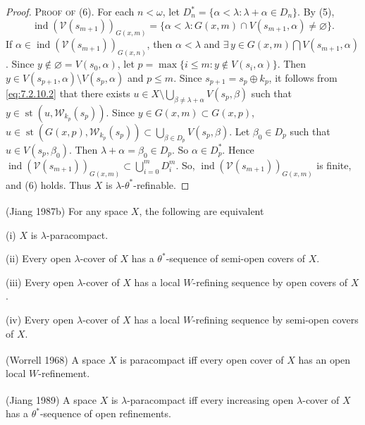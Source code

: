 \documentclass[jisng7iii.tex]{subfiles}
\begin{document}
\begin{proof}
\noindent\textsc{Proof of (6)}. For each $n < \omega$, let $D^*_{n} = \{\alpha < \lambda: \lambda + \alpha \in D_n\}$. 
By (5),
$$\operatorname{ind}(\mathscr{V}(s_{m+1}))_{G(x,m)} = 
\{\alpha < \lambda: G(x, m) \cap V(s_{m+1}, \alpha) \ne \varnothing\}.$$
If  $\alpha\in \operatorname{ind}(\mathscr{V}(s_{m+1}))_{G(x,n)}$, 
then $\alpha < \lambda$ and $\exists\, y\in G(x, m)\bigcap V(s_{m+1}, \alpha)$.
Since $y\notin \varnothing = V(s_0, \alpha)$, let $p = \max\{i \le m: y\notin V(s_i, \alpha)\}$.
Then $y\in V(s_{p+1}, \alpha)\setminus V(s_p, \alpha)$ and $p \le m$.
Since $s_{p+1}= s_p\oplus k_p$, it follows from \eqref{eq:7.2.10.2}
that there exists $u\in X\setminus\bigcup_{\beta \ne \lambda+ \alpha} V(s_p, \beta)$ such that
$y \in \operatorname{st}(u, \mathscr{W}_{k_p}(s_p))$. Since $y\in G(x, m) \subset G(x, p)$,
$u\in \operatorname{st}(G(x, p), \mathscr{W}_{k_p}(s_p))\subset \bigcup_{\beta\in D_p} V(s_p, \beta)$.
Let $\beta_0\in D_p$ such that $u\in V(s_p, \beta_0)$. Then $\lambda + \alpha = \beta_0 \in D_p$. So
$\alpha\in D^*_p$. Hence
$\operatorname{ind}(\mathscr{V}(s_{m+1}))_{G(x, m)}\subset \bigcup_{i=0}^m D_i^m$. 
So, $\operatorname{ind}(\mathscr{V}(s_{m+1}))_{G(x, m)}$ is finite, and (6) holds.
Thus $X$ is $\lambda$-$\theta^*$-refinable.
\end{proof}

{\corollary{} \label{cor:7.2.11}
\textup{(\hstretch{1.8}{[}Jiang 1987b\hstretch{1.8}{]}\textsuperscript{\cite{Jiang1987b}})}   
For any space $X$, the following are equivalent

\textup{(i)} $X$ is $\lambda$-paracompact.

\textup{(ii)} Every open $\lambda$-cover of $X$ has a $\theta^*$-sequence of semi-open covers of $X$.

\textup{(iii)}  Every open $\lambda$-cover of $X$ has a local $W$-refining sequence by open covers of $X$.

\textup{(iv)} Every open $\lambda$-cover of $X$ has a local $W$-refining sequence by 
semi-open covers of $X$. \hfill\qedsymbol
}

{\corollary{} \label{cor:7.2.12}
\textup{(\hstretch{1.8}{[}Worrell 1968\hstretch{1.8}{]}\textsuperscript{\cite{Worrell1968}})}  
A space $X$ is paracompact iff every open cover of $X$ has an open local 
$W$-refinement.\hfill\qedsymbol
}

{\theorem{} \label{th:7.2.13} 
\textup{(\hstretch{1.8}{[}Jiang 1989\hstretch{1.8}{]}\textsuperscript{\cite{Jiang1989}})}  
A space $X$ is $\lambda$-paracompact iff every increasing open $\lambda$-cover of $X$ 
has a $\theta^*$-sequence of open refinements.
}
\end{document}

